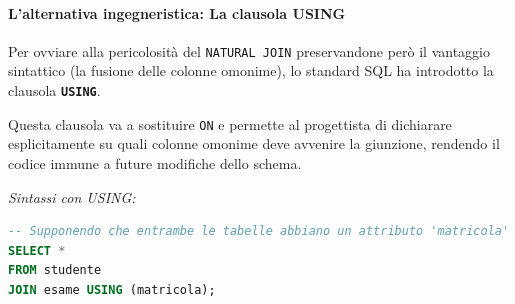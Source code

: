 \paragraph{L'alternativa ingegneristica: La clausola USING}

Per ovviare alla pericolosità del \texttt{NATURAL JOIN} preservandone però il vantaggio sintattico (la fusione delle colonne omonime), lo standard SQL ha introdotto la clausola \textbf{\texttt{USING}}.

Questa clausola va a sostituire \texttt{ON} e permette al progettista di dichiarare esplicitamente su quali colonne omonime deve avvenire la giunzione, rendendo il codice immune a future modifiche dello schema.

\textit{Sintassi con USING:}
\begin{lstlisting}[language=SQL, basicstyle=\ttfamily\small, keywordstyle=\color{blue}\bfseries]
-- Supponendo che entrambe le tabelle abbiano un attributo 'matricola'
SELECT *
FROM studente
JOIN esame USING (matricola);
\end{lstlisting}




